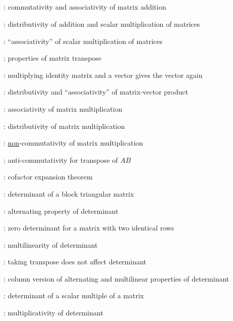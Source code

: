\subsection*{}
\item {}: commutativity and associativity of
matrix addition
\item {}: distributivity of addition
and scalar multiplication of matrices
\item {}: ``associativity'' of scalar multiplication of matrices
\item {}: properties of matrix transpose
\item {}: multiplying identity matrix and a vector gives the vector again
\item {}: distributivity and ``associativity'' of matrix-vector product
\item {}: associativity of matrix multiplication
\item {}: distributivity of matrix multiplication
\item {}: \underline{non}-commutativity of matrix multiplication
\item {}: anti-commutativity for transpose of \(AB\)
\item {}: cofactor expansion theorem
\item {}: determinant of a block triangular matrix
\item {}: alternating property of determinant
\item {}: zero determinant for a matrix with two identical rows
\item {}: multilinearity of determinant
\item {}: taking transpose does not affect determinant
\item {}: column version of alternating and multilinear properties of determinant
\item {}: determinant of a scalar multiple of a matrix
\item {}: multiplicativity of determinant
